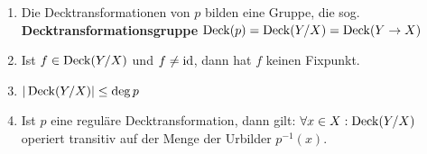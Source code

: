 \begin{korollar}%
    \begin{enumerate}[label=\alph*),ref=\theplaindefinition.\alph*]
        \item Die Decktransformationen von $p$ bilden eine Gruppe, 
              die sog. \textbf{Decktransformationsgruppe}
              $\operatorname{Deck}(p) = \operatorname{Deck}(Y/X) = \operatorname{Deck}(Y \rightarrow X)$
        \item Ist $f \in \operatorname{Deck}(Y/X)$ und $f \neq \textnormal{id}$, dann hat
              $f$ keinen Fixpunkt.
        \item $|\operatorname{Deck}(Y/X)| \leq \deg{p}$\label{kor:12.14c}
        \item Ist $p$ eine reguläre Decktransformation, dann gilt:
              $\forall x \in X: \operatorname{Deck}(Y/X)$ operiert transitiv
              auf der Menge der Urbilder $p^{-1}(x)$.
    \end{enumerate}
\end{korollar}

